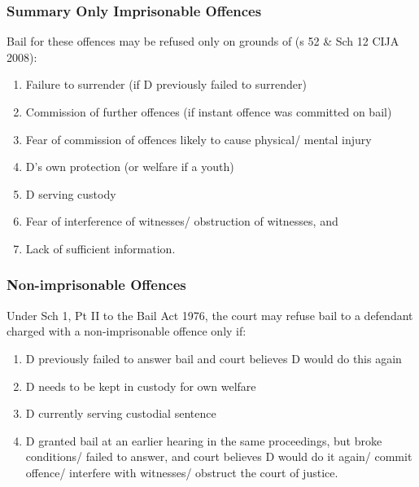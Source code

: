 \documentclass[
]{article}
\providecommand{\tightlist}{%
  \setlength{\itemsep}{0pt}\setlength{\parskip}{0pt}}
\begin{document}
\hypertarget{summary-only-imprisonable-offences}{%
\subsubsection{Summary Only Imprisonable
Offences}\label{summary-only-imprisonable-offences}}

Bail for these offences may be refused only on grounds of (s 52 \& Sch
12 CIJA 2008):

\begin{enumerate}
\def\labelenumi{\arabic{enumi}.}
\tightlist
\item
  Failure to surrender (if D previously failed to surrender)
\item
  Commission of further offences (if instant offence was committed on
  bail)
\item
  Fear of commission of offences likely to cause physical/ mental injury
\item
  D's own protection (or welfare if a youth)
\item
  D serving custody
\item
  Fear of interference of witnesses/ obstruction of witnesses, and
\item
  Lack of sufficient information.
\end{enumerate}

\hypertarget{non-imprisonable-offences}{%
\subsubsection{Non-imprisonable
Offences}\label{non-imprisonable-offences}}

Under Sch 1, Pt II to the Bail Act 1976, the court may refuse bail to a
defendant charged with a non-imprisonable offence only if:

\begin{enumerate}
\def\labelenumi{\arabic{enumi}.}
\tightlist
\item
  D previously failed to answer bail and court believes D would do this
  again
\item
  D needs to be kept in custody for own welfare
\item
  D currently serving custodial sentence
\item
  D granted bail at an earlier hearing in the same proceedings, but
  broke conditions/ failed to answer, and court believes D would do it
  again/ commit offence/ interfere with witnesses/ obstruct the court of
  justice.
\end{enumerate}
\end{document}
